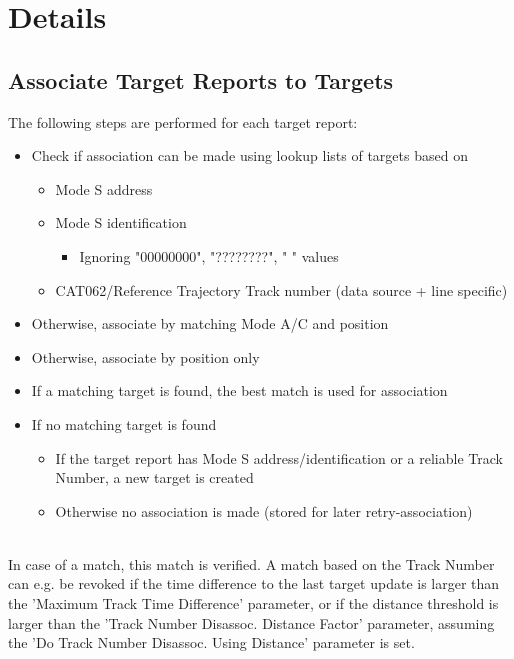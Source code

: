 

\section{Details}
\subsection{Associate Target Reports to Targets}

The following steps are performed for each target report:
\begin{itemize}
\item Check if association can be made using lookup lists of targets based on
\begin{itemize}
\item Mode S address
\item Mode S identification
\begin{itemize}
\item Ignoring "00000000", "????????", "        " values
\end{itemize}
\item CAT062/Reference Trajectory Track number (data source + line specific)
\end{itemize}
\item Otherwise, associate by matching Mode A/C and position
\item Otherwise, associate by position only
\item If a matching target is found, the best match is used for association
\item If no matching target is found
\begin{itemize}
\item If the target report has Mode S address/identification or a reliable Track Number, a new target is created
\item Otherwise no association is made (stored for later retry-association)
\end{itemize}
\end{itemize}
\ \\

In case of a match, this match is verified. A match based on the Track Number can e.g. be revoked if the time difference to the last target update is larger than the 'Maximum Track Time Difference' parameter, 
or if the distance threshold is larger than the 'Track Number Disassoc. Distance Factor' parameter, assuming the 'Do Track Number Disassoc. Using Distance' parameter is set. \\

